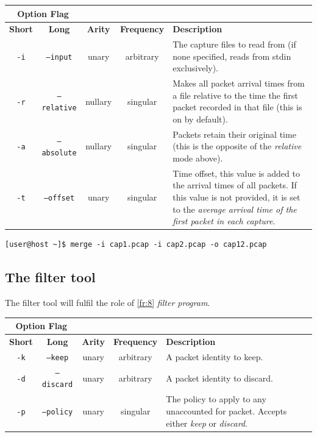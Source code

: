 \documentclass[10pt,a4paper,notitlepage]{report}
\begin{document}
\begin{tabularx}{\textwidth}{|c|c|c|c|X|}
\cline{1-2}
\multicolumn{2}{|c|}{\textbf{Option Flag}} & \multicolumn{3}{c}{}\\ \hline
\textbf{Short} & \textbf{Long} & \textbf{Arity} & \textbf{Frequency} & \textbf{Description} \\ \hline
\texttt{-i} & \texttt{--input} & unary & arbitrary & The capture files to read from (if none specified, reads from stdin exclusively).\\ \hline
\texttt{-r} & \texttt{--relative} & nullary & singular & Makes all packet arrival times from a file relative to the time the first packet recorded in that file (this is on by default).\\ \hline
\texttt{-a} & \texttt{--absolute} & nullary & singular & Packets retain their original time (this is the opposite of the \emph{relative} mode above).\\ \hline
\texttt{-t} & \texttt{--offset} & unary & singular & Time offset, this value is added to the arrival times of all packets. If this value is not provided, it is set to the \emph{average arrival time of the first packet in each capture}. \\ \hline
\end{tabularx}

\begin{verbatim}
[user@host ~]$ merge -i cap1.pcap -i cap2.pcap -o cap12.pcap
\end{verbatim}
\subsection{The filter tool}
The filter tool will fulfil the role of \ref{fr:8} \emph{filter program}.

\begin{tabularx}{\textwidth}{|c|c|c|c|X|}
\cline{1-2}
\multicolumn{2}{|c|}{\textbf{Option Flag}} & \multicolumn{3}{c}{}\\ \hline
\textbf{Short} & \textbf{Long} & \textbf{Arity} & \textbf{Frequency} & \textbf{Description} \\ \hline
\texttt{-k} & \texttt{--keep} & unary & arbitrary & A packet identity to keep.\\ \hline
\texttt{-d} & \texttt{--discard} & unary & arbitrary & A packet identity to discard.\\ \hline
\texttt{-p} & \texttt{--policy} & unary & singular & The policy to apply to any unaccounted for packet. Accepts either \emph{keep} or \emph{discard}.\\ \hline
\end{tabularx}
\end{document}
